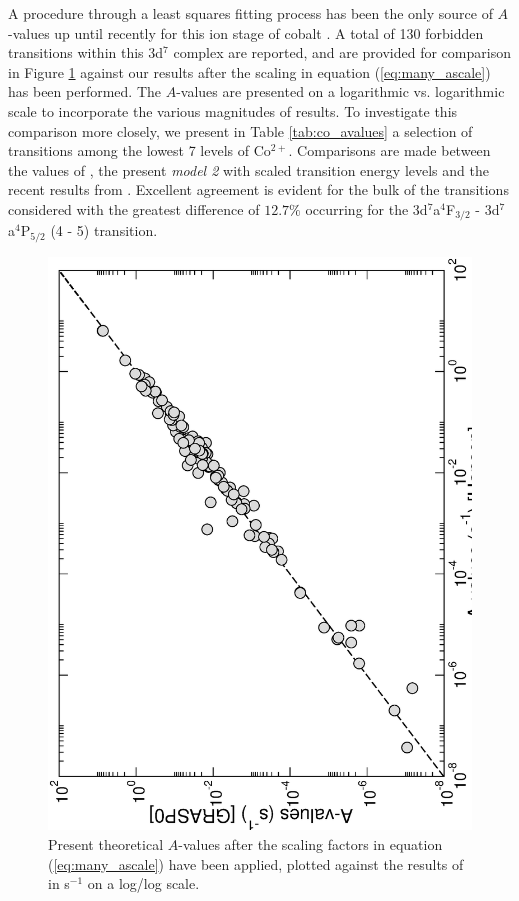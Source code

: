 A procedure through a least squares fitting process \citep{1981tass.book.....C} has been the only source of $A$-values up until recently for this ion stage of cobalt \citep{1984ApJ...277..435H}. A total of 130 forbidden transitions within this 3d$^7$ complex are reported, and are provided for comparison in Figure \ref{fig:co_avalues} against our results after the scaling in equation (\ref{eq:many_ascale}) has been performed. The $A$-values are presented on a logarithmic vs. logarithmic scale to incorporate the various magnitudes of results. To investigate this comparison more closely, we present in Table \ref{tab:co_avalues} a selection of transitions among the lowest 7 levels of Co$^{2+}$. Comparisons are made between the values of \citep{1984ApJ...277..435H}, the present \textit{model 2} with scaled transition energy levels and the recent results from \citet{2016MNRAS.tmp..556S}. Excellent agreement is evident for the bulk of the transitions considered with the greatest difference of $12.7\%$ occurring for the 3d$^7$a$^4$F$_{3/2}$ - 3d$^7$a$^4$P$_{5/2}$ (4 - 5) transition.

%
\begin{figure}[hbt]
\includegraphics[scale=0.52, angle=-90]{Figures/Cobalt/Avalues_new.eps}
\caption{Present theoretical $A$-values after the scaling factors in equation (\ref{eq:many_ascale}) have been applied, plotted against the results of \citet{1984ApJ...277..435H} in s$^{-1}$ on a log/log scale. \label{fig:co_avalues}}
\end{figure}
%

